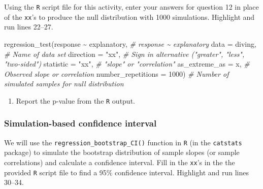 \documentclass[
]{report}
\newenvironment{Shaded}{\begin{snugshade}}{\end{snugshade}}
\newcommand{\AttributeTok}[1]{\textcolor[rgb]{0.77,0.63,0.00}{#1}}
\newcommand{\CommentTok}[1]{\textcolor[rgb]{0.56,0.35,0.01}{\textit{#1}}}
\newcommand{\DecValTok}[1]{\textcolor[rgb]{0.00,0.00,0.81}{#1}}
\newcommand{\FunctionTok}[1]{\textcolor[rgb]{0.00,0.00,0.00}{#1}}
\newcommand{\NormalTok}[1]{#1}
\newcommand{\SpecialCharTok}[1]{\textcolor[rgb]{0.00,0.00,0.00}{#1}}
\newcommand{\StringTok}[1]{\textcolor[rgb]{0.31,0.60,0.02}{#1}}
\providecommand{\tightlist}{%
  \setlength{\itemsep}{0pt}\setlength{\parskip}{0pt}}
\begin{document}
\vspace{.2in}

Using the \texttt{R} script file for this activity, enter your answers for question 12 in place of the \texttt{xx}'s to produce the null distribution with 1000 simulations. Highlight and run lines 22--27.

\begin{Shaded}
\begin{Highlighting}[]
\FunctionTok{regression\_test}\NormalTok{(response }\SpecialCharTok{\textasciitilde{}}\NormalTok{ explanatory, }\CommentTok{\# response \textasciitilde{} explanatory}
               \AttributeTok{data =}\NormalTok{ diving, }\CommentTok{\# Name of data set}
               \AttributeTok{direction =} \StringTok{"xx"}\NormalTok{, }\CommentTok{\# Sign in alternative ("greater", "less", "two{-}sided")}
               \AttributeTok{statistic =} \StringTok{"xx"}\NormalTok{, }\CommentTok{\# "slope" or "correlation"}
               \AttributeTok{as\_extreme\_as =}\NormalTok{ x, }\CommentTok{\# Observed slope or correlation}
               \AttributeTok{number\_repetitions =} \DecValTok{1000}\NormalTok{) }\CommentTok{\# Number of simulated samples for null distribution}
\end{Highlighting}
\end{Shaded}

\begin{enumerate}
\def\labelenumi{\arabic{enumi}.}
\setcounter{enumi}{10}
\tightlist
\item
  Report the p-value from the \texttt{R} output.
  \vspace{0.5in}
\end{enumerate}

\hypertarget{simulation-based-confidence-interval}{%
\subsubsection*{Simulation-based confidence interval}\label{simulation-based-confidence-interval}}

We will use the \texttt{regression\_bootstrap\_CI()} function in \texttt{R} (in the \texttt{catstats} package) to simulate the bootstrap distribution of sample slopes (or sample correlations) and calculate a confidence interval. Fill in the \texttt{xx}'s in the the provided \texttt{R} script file to find a 95\% confidence interval. Highlight and run lines 30--34.
\end{document}
